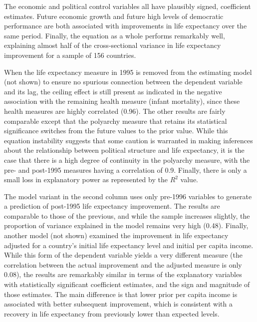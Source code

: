 \documentclass[12pt]{article}
\begin{document}
The economic and political control variables all have plausibly signed, coefficient estimates. Future economic growth and future high levels of democratic performance are both associated with improvements in life expectancy over the same period. Finally, the equation as a whole performs remarkably well, explaining almost half of the cross-sectional variance in life expectancy improvement for a sample of 156 countries.

When the life expectancy measure in 1995 is removed from the estimating model (not shown)
to ensure no spurious connection between the dependent variable and its lag, the ceiling effect is still present as indicated in the negative association with the remaining health measure (infant mortality), since these health measures are highly correlated (0.96). The other results are fairly comparable except that the polyarchy measure that retains its statistical significance switches from the future values to the prior value. While this equation instability suggests that some caution is warranted in making inferences about the relationship between political structure and life expectancy, it is the case that there is a high degree of continuity in the polyarchy measure, with the pre- and post-1995 measures having a correlation of 0.9. Finally, there is only a small loss in explanatory power as represented by the $R^2$ value.

The model variant in the second column uses only pre-1996 variables to generate a prediction of post-1995 life expectancy improvement. The results are comparable to those of the previous, and while the sample increases slightly, the proportion of variance explained in the model remains very high (0.48). Finally, another model (not shown) examined the improvement in life expectancy adjusted for a country's initial life expectancy level and initial per capita income. While this form of the dependent variable yields a very different measure (the correlation between the actual improvement and the adjusted measure is only 0.08), the results are remarkably similar in terms of the explanatory variables with statistically significant coefficient estimates, and the sign and magnitude of those estimates. The main difference is that lower prior per capita income is associated with better subsequent improvement, which is consistent with a recovery in life expectancy from previously lower than expected levels.
\end{document}
